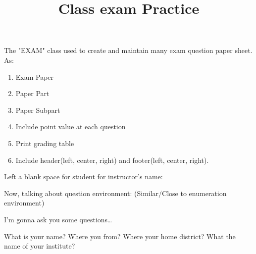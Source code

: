 \documentclass[addpoints, 12pt]{exam}
\title{Class exam Practice}
\begin{document}
\maketitle

{
	The "EXAM" class used to create and maintain many exam question paper sheet. As:
	\begin{enumerate}
		\item Exam Paper
		\item Paper Part
		\item Paper Subpart
		\item Include point value at each question
		\item Print grading table
		\item Include header(left, center, right) and footer(left, center, right).
	\end{enumerate}
}\par

Left a blank space for student for instructor's name:

Now, talking about question environment: (Similar/Close to enumeration environment)\\
{
I'm gonna ask you some questions\dots
\begin{questions}
\question[1] What is your name?
\question[2] Where you from?
\question[3] Where your home district?
\question[4] What the name of your institute?
\end{questions}
}\par
\end{document}
